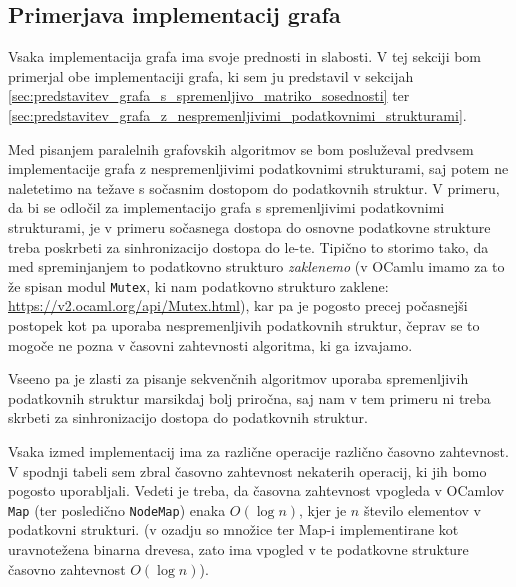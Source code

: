 \documentclass[mat1, tisk]{fmfdelo}
\begin{document}
\subsection{Primerjava implementacij grafa} \label{sec:primerjava_implementacij_grafa}

Vsaka implementacija grafa ima svoje prednosti in slabosti. V tej sekciji bom primerjal obe implementaciji grafa, ki sem ju predstavil v 
sekcijah \ref{sec:predstavitev_grafa_s_spremenljivo_matriko_sosednosti} ter \ref{sec:predstavitev_grafa_z_nespremenljivimi_podatkovnimi_strukturami}.

Med pisanjem paralelnih grafovskih algoritmov se bom posluževal predvsem implementacije grafa z nespremenljivimi podatkovnimi strukturami, saj potem ne
naletetimo na težave s sočasnim dostopom do podatkovnih struktur. V primeru, da bi se odločil za implementacijo grafa s spremenljivimi podatkovnimi strukturami, je v
primeru sočasnega dostopa do osnovne podatkovne strukture treba poskrbeti za sinhronizacijo dostopa do le-te. Tipično to storimo tako, da med spreminjanjem to podatkovno
strukturo \textit{zaklenemo} (v OCamlu imamo za to že spisan modul \texttt{Mutex}, ki nam podatkovno strukturo zaklene: \url{https://v2.ocaml.org/api/Mutex.html}),
kar pa je pogosto precej počasnejši postopek kot pa uporaba nespremenljivih podatkovnih struktur, čeprav se to mogoče ne pozna v časovni zahtevnosti algoritma, ki ga izvajamo.

Vseeno pa je zlasti za pisanje sekvenčnih algoritmov uporaba spremenljivih podatkovnih struktur marsikdaj bolj priročna, saj nam v tem primeru ni treba skrbeti za sinhronizacijo 
dostopa do podatkovnih struktur.

Vsaka izmed implementacij ima za različne operacije različno časovno zahtevnost. V spodnji tabeli sem zbral časovno zahtevnost nekaterih operacij, ki jih bomo pogosto uporabljali.
Vedeti je treba, da časovna zahtevnost vpogleda v OCamlov \texttt{Map} (ter posledično \texttt{NodeMap}) enaka $O(\log n)$, kjer je $n$ število elementov v podatkovni strukturi.
(v ozadju so množice ter Map-i implementirane kot uravnotežena binarna drevesa, zato ima vpogled v te podatkovne strukture časovno zahtevnost $O(\log n)$).
\end{document}
